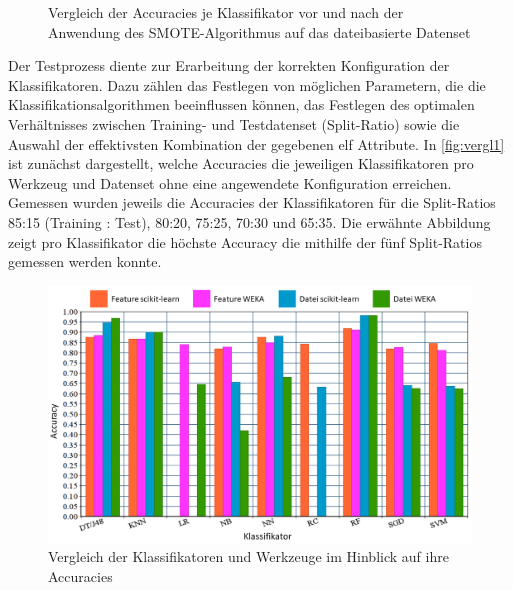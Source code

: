 \begin{figure}[t]
  \centering
  \caption{Vergleich der Accuracies je Klassifikator vor und nach der Anwendung des SMOTE-Algorithmus auf das dateibasierte Datenset\label{fig:smoted}}
\end{figure}

Der Testprozess diente zur Erarbeitung der korrekten Konfiguration der Klassifikatoren. Dazu zählen das Festlegen von möglichen Parametern, die die Klassifikationsalgorithmen beeinflussen können, das Festlegen des optimalen Verhältnisses zwischen Training- und Testdatenset (Split-Ratio) sowie die Auswahl der effektivsten Kombination der gegebenen elf Attribute. In \autoref{fig:vergl1} ist zunächst dargestellt, welche Accuracies die jeweiligen Klassifikatoren pro Werkzeug und Datenset ohne eine angewendete Konfiguration erreichen. Gemessen wurden jeweils die Accuracies der Klassifikatoren für die Split-Ratios 85:15 (Training : Test), 80:20, 75:25, 70:30 und 65:35. Die erwähnte Abbildung zeigt pro Klassifikator die höchste Accuracy die mithilfe der fünf Split-Ratios gemessen werden konnte. 

\begin{figure}[t]
    \centering
    \includegraphics[width=\textwidth]{images/Vergleich1}
    \caption{Vergleich der Klassifikatoren und Werkzeuge im Hinblick auf ihre Accuracies\label{fig:vergl1}}
\end{figure}

